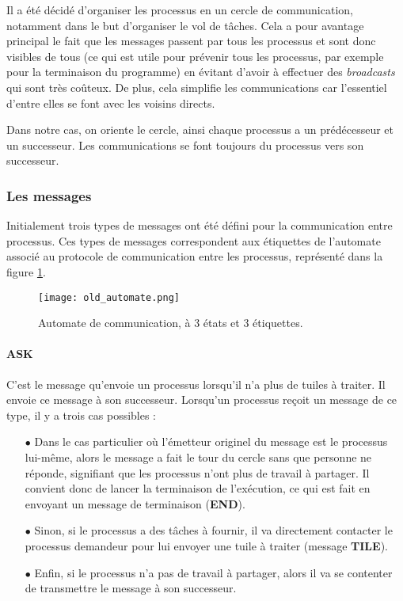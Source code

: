 Il a été décidé d'organiser les processus en un cercle de communication, notamment dans le but d'organiser le vol de tâches. Cela a pour avantage principal le fait que les messages passent par tous les processus et sont donc visibles de tous (ce qui est utile pour prévenir tous les processus, par exemple pour la terminaison du programme) en évitant d'avoir à effectuer des \emph{broadcasts} qui sont très coûteux. De plus, cela simplifie les communications car l'essentiel d'entre elles se font avec les voisins directs.

Dans notre cas, on oriente le cercle, ainsi chaque processus a un prédécesseur et un successeur. Les communications se font toujours du processus vers son successeur.

\subsubsection*{Les messages}

Initialement trois types de messages ont été défini pour la communication entre processus. Ces types de messages correspondent aux étiquettes de l'automate associé au protocole de communication entre les processus, représenté dans la figure \ref{img:old_automate}.

\begin{figure}
\raggedright
\texttt{[image: old\_automate.png]}
\caption{Automate de communication, à 3 états et 3 étiquettes.}
\label{img:old_automate}
\end{figure}

\paragraph{ASK}
C'est le message qu'envoie un processus lorsqu'il n'a plus de tuiles à traiter. Il envoie ce message à son successeur. Lorsqu'un processus reçoit un message de ce type, il y a trois cas possibles :
\begin{itemize}
\item[$\bullet$]Dans le cas particulier où l'émetteur originel du message est le processus lui-même, alors le message a fait le tour du cercle sans que personne ne réponde, signifiant que les processus n'ont plus de travail à partager. Il convient donc de lancer la terminaison de l'exécution, ce qui est fait en envoyant un message de terminaison (\textbf{END}).
\item[$\bullet$]Sinon, si le processus a des tâches à fournir, il va directement contacter le processus demandeur pour lui envoyer une tuile à traiter (message \textbf{TILE}).
\item[$\bullet$]Enfin, si le processus n'a pas de travail à partager, alors il va se contenter de transmettre le message à son successeur.
\end{itemize}


